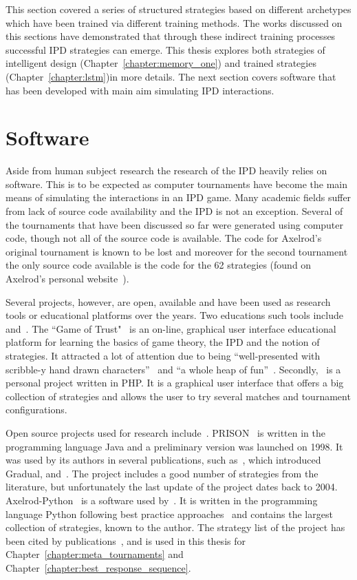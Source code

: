 This section covered a series of structured strategies based on different
archetypes which have been trained via different training methods. The works
discussed on this sections have demonstrated that through these indirect
training processes successful IPD strategies can emerge. This thesis explores
both strategies of intelligent design (Chapter~\ref{chapter:memory_one}) and
trained strategies (Chapter~\ref{chapter:lstm})in more details. The next section
covers software that has been developed with main aim simulating IPD
interactions.

\section{Software}\label{section:software}

Aside from human subject research the research of the IPD heavily relies on software.
This is to be expected as computer tournaments have become the main
means of simulating the interactions in an IPD game.
Many academic fields suffer from lack of source code availability and the IPD
is not an exception. Several of the tournaments that have been discussed so far were generated
using computer code, though not all of the source code is available.
The code for Axelrod's original tournament is known to be lost and
moreover for the second tournament the only source code available is the code
for the 62 strategies (found on Axelrod's personal website~\cite{fortan_code}).

Several projects, however, are open, available and have been used as research
tools or educational platforms over the years. Two educations such tools include
\cite{pd_trust} and~\cite{trust_blogb}.
The ``Game of Trust"~\cite{pd_trust} is an on-line, graphical user interface
educational platform for learning the basics of game theory, the IPD
and the notion of strategies. It attracted a lot of attention
due to being ``well-presented with scribble-y hand drawn
characters''~\cite{trust_blogb} and ``a whole heap of fun''~\cite{trust_bloga}.
Secondly,~\cite{pd_game} is a personal project written in PHP. It is a graphical user
interface that offers a big collection of strategies and allows the user to try
several matches and tournament configurations.

Open source projects used for research include~\cite{prison, axelrodproject}.
PRISON~\cite{prison} is written in the programming language Java and a
preliminary version was launched on 1998. It was used by its authors in several
publications, such as~\cite{Beaufils1997}, which introduced Gradual,
and~\cite{Beaufils1988}. The project includes a good number of strategies from
the literature, but unfortunately the last update of the project dates back to
2004. Axelrod-Python~\cite{axelrodproject} is a software used
by~\cite{Knight2017,KnightHGC17, Goodman2018, Wang2017}. It is written in the
programming language Python following best practice
approaches~\cite{Aberdour2007, Benureau2018} and contains the largest collection
of strategies, known to the author. The strategy list of the project has been
cited by publications~\cite{Anastassacos2018, Hayes2017, Neumann2018}, and is
used in this thesis for Chapter~\ref{chapter:meta_tournaments} and
Chapter~\ref{chapter:best_response_sequence}.


